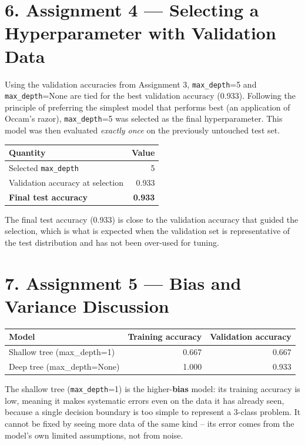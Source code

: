 \documentclass[12pt,a4paper]{article}
\begin{document}
\section*{6. Assignment 4 --- Selecting a Hyperparameter with Validation Data}

Using the validation accuracies from Assignment 3, \texttt{max\_depth}=5 and \texttt{max\_depth}=None are tied for the best validation accuracy (0.933). Following the principle of preferring the simplest model that performs best (an application of Occam's razor), \texttt{max\_depth}=5 was selected as the final hyperparameter. This model was then evaluated \emph{exactly once} on the previously untouched test set.

\begin{center}
\begin{tabular}{@{}lr@{}}
\toprule
\textbf{Quantity} & \textbf{Value} \\
\midrule
Selected \texttt{max\_depth}           & 5     \\
Validation accuracy at selection       & 0.933 \\
\textbf{Final test accuracy}           & \textbf{0.933} \\
\bottomrule
\end{tabular}
\end{center}

The final test accuracy (0.933) is close to the validation accuracy that guided the selection, which is what is expected when the validation set is representative of the test distribution and has not been over-used for tuning.

\section*{7. Assignment 5 --- Bias and Variance Discussion}

\begin{center}
\begin{tabular}{@{}lrr@{}}
\toprule
\textbf{Model} & \textbf{Training accuracy} & \textbf{Validation accuracy} \\
\midrule
Shallow tree (max\_depth=1)   & 0.667 & 0.667 \\
Deep tree (max\_depth=None)   & 1.000 & 0.933 \\
\bottomrule
\end{tabular}
\end{center}

The shallow tree (\texttt{max\_depth}=1) is the higher-\textbf{bias} model: its training accuracy is low, meaning it makes systematic errors even on the data it has already seen, because a single decision boundary is too simple to represent a 3-class problem. It cannot be fixed by seeing more data of the same kind -- its error comes from the model's own limited assumptions, not from noise.
\end{document}
